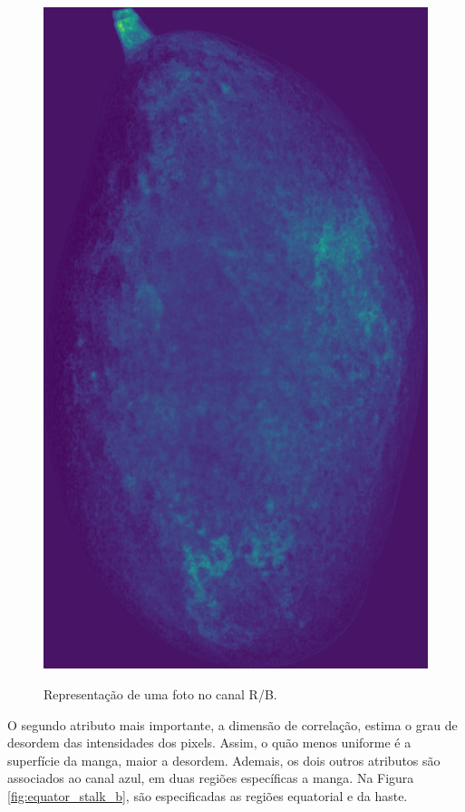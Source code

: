 \begin{figure}[H]
\centering
	\caption{Representação de uma foto no canal R/B.}
	\includegraphics[scale=0.07]{img/RB_rate_img.jpg}
	\label{fig:rbrate_fig}
\end{figure}

O segundo atributo mais importante, a dimensão de correlação, estima o grau de desordem das intensidades dos pixels. Assim, o quão menos uniforme é a superfície da manga, maior a desordem. Ademais, os dois outros atributos são associados ao canal azul, em duas regiões específicas a manga. Na Figura \ref{fig:equator_stalk_b}, são especificadas as regiões equatorial e da haste.

